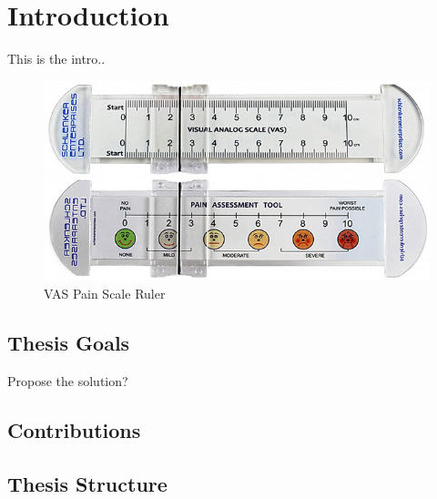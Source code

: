 \chapter{Introduction}

This is the intro.. 


\begin{figure}[h!]
    \centering
    \includegraphics[width=1\textwidth]{figures/real_vas.jpg}
    \caption{VAS Pain Scale Ruler\cite{real_vas}}
    \label{real_vas}
\end{figure}

\section{Thesis Goals}

Propose the solution?

\section{Contributions}

\section{Thesis Structure}